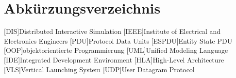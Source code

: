 


\newpage
\chapter*{Abkürzungsverzeichnis}
%
\begin{acronym}[XXXXXX]
	\setlength{\itemsep}{-\parsep}
	[DIS]{Distributed Interactive Simulation}
	[IEEE]{Institute of Electrical and Electronics Engineers}
	[PDU]{Protocol Data Units}
	[ESPDU]{Entity State PDU}
	[OOP]{objektorientierte Programmierung }
	[UML]{Unified Modeling Language}
	[IDE]{Integrated Development Environment}
	[HLA]{High-Level Architecture}
	[VLS]{Vertical Launching System }
	[UDP]{User Datagram Protocol}
	
\end{acronym}
\newpage